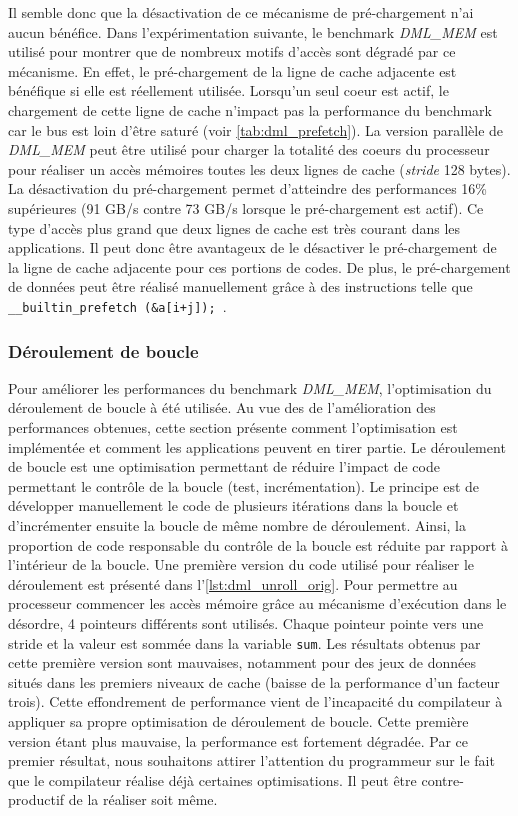         Il semble donc que la désactivation de ce mécanisme de pré-chargement n'ai aucun bénéfice. Dans l'expérimentation suivante, le benchmark \textit{DML\_MEM} est utilisé pour montrer que de nombreux motifs d'accès sont dégradé par ce mécanisme. En effet, le pré-chargement de la ligne de cache adjacente est bénéfique si elle est réellement utilisée. Lorsqu'un seul coeur est actif, le chargement de cette ligne de cache n'impact pas la performance du benchmark car le bus est loin d'être saturé (voir \autoref{tab:dml_prefetch}). La version parallèle de \textit{DML\_MEM} peut être utilisé pour charger la totalité des coeurs du processeur pour réaliser un accès mémoires toutes les deux lignes de cache (\textit{stride} 128 bytes). La désactivation du pré-chargement permet d'atteindre des performances 16\% supérieures (91 GB/s contre 73 GB/s lorsque le pré-chargement est actif). Ce type d'accès plus grand que deux lignes de cache est très courant dans les applications. Il peut donc être avantageux de le désactiver le pré-chargement de la ligne de cache adjacente pour ces portions de codes. De plus, le pré-chargement de données peut être réalisé manuellement grâce à des instructions telle que \verb| __builtin_prefetch (&a[i+j]); |.
        
        
    
    \subsubsection{Déroulement de boucle}
    Pour améliorer les performances du benchmark \textit{DML\_MEM}, l'optimisation du déroulement de boucle à été utilisée. Au vue des de l'amélioration des performances obtenues, cette section présente comment l'optimisation est implémentée et comment les applications peuvent en tirer partie. 
    Le déroulement de boucle est une optimisation permettant de réduire l'impact de code permettant le contrôle de la boucle (test, incrémentation). Le principe est de développer manuellement le code de plusieurs itérations dans la boucle et d'incrémenter ensuite la boucle de même nombre de déroulement. Ainsi, la proportion de code responsable du contrôle de la boucle est réduite par rapport à l'intérieur de la boucle. Une première version du code utilisé pour réaliser le déroulement est présenté dans l'\autoref{lst:dml_unroll_orig}. Pour permettre au processeur commencer les accès mémoire grâce au mécanisme d'exécution dans le désordre, 4 pointeurs différents sont utilisés. Chaque pointeur pointe vers une stride et la valeur est sommée dans la variable \verb|sum|. Les résultats obtenus par cette première version sont mauvaises, notamment pour des jeux de données situés dans les premiers niveaux de cache (baisse de la performance d'un facteur trois). Cette effondrement de performance vient de l'incapacité du compilateur à appliquer sa propre optimisation de déroulement de boucle. Cette première version étant plus mauvaise, la performance est fortement dégradée. Par ce premier résultat, nous souhaitons attirer l'attention du programmeur sur le fait que le compilateur réalise déjà certaines optimisations. Il peut être contre-productif de la réaliser soit même. 
    
